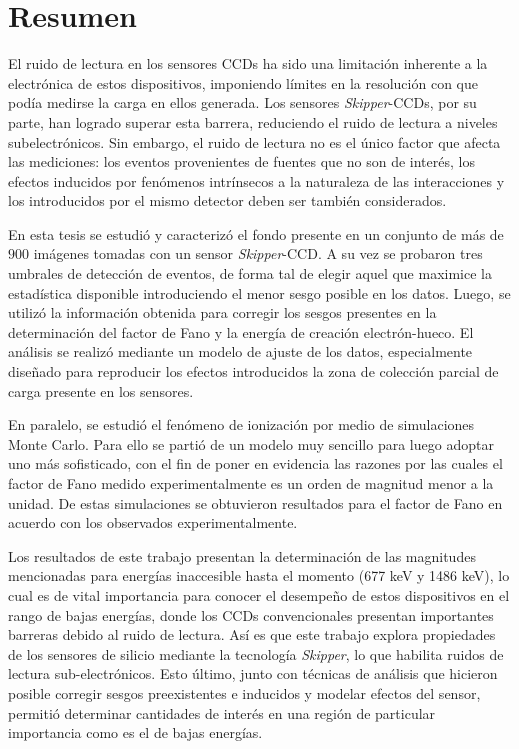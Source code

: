 \newpage
\chapter*{Resumen}
\thispagestyle{empty}
\vspace{-10mm}
\noindent El ruido de lectura en los sensores CCDs ha sido una limitación inherente a la electrónica de estos dispositivos, imponiendo límites en la resolución con que podía medirse la carga en ellos generada. Los sensores \textit{Skipper}-CCDs, por su parte, han logrado superar esta barrera, reduciendo el ruido de lectura a niveles subelectrónicos. Sin embargo, el ruido de lectura no es el único factor que afecta las mediciones: los eventos provenientes de fuentes que no son de interés, los efectos inducidos por fenómenos intrínsecos a la naturaleza de las interacciones y los introducidos por el mismo detector deben ser también considerados.


En esta tesis se estudió y caracterizó el fondo presente en un conjunto de más de $900$ imágenes tomadas con un sensor \textit{Skipper}-CCD.
A su vez se probaron tres umbrales de detección de eventos, de forma tal de elegir aquel que maximice la estadística disponible introduciendo el menor sesgo posible en los datos. Luego, se utilizó la información obtenida para corregir los sesgos presentes en la determinación del factor de Fano y la energía de creación electrón-hueco. 
El análisis se realizó mediante un modelo de ajuste de los datos, especialmente diseñado para reproducir los efectos introducidos la zona de colección parcial de carga presente en los sensores.


En paralelo, se estudió el fenómeno de ionización por medio de simulaciones Monte Carlo. Para ello se partió de un modelo muy sencillo para luego adoptar uno más sofisticado, con el fin de poner en evidencia las razones por las cuales el factor de Fano medido experimentalmente es un orden de magnitud menor a la unidad. De estas simulaciones se obtuvieron resultados para el factor de Fano en acuerdo con los observados experimentalmente.


Los resultados de este trabajo presentan la determinación de las magnitudes mencionadas para energías inaccesible hasta el momento (677 keV y 1486 keV), lo cual es de vital importancia para conocer el desempeño de estos dispositivos en el rango de bajas energías, donde los CCDs convencionales presentan importantes barreras debido al ruido de lectura. 
Así es que este trabajo explora propiedades de los sensores de silicio mediante la tecnología \textit{Skipper}, lo que habilita ruidos de lectura sub-electrónicos. Esto último, junto con técnicas de análisis que hicieron posible corregir sesgos preexistentes e inducidos y modelar efectos del sensor, permitió determinar cantidades de interés en una región de particular importancia como es el de bajas energías.


\newpage
\thispagestyle{empty} \mbox{}
\thispagestyle{empty}
